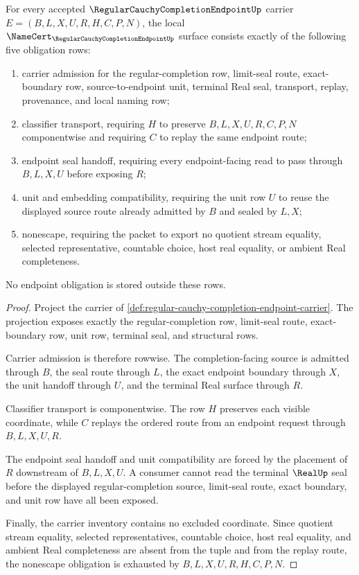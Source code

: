 \begin{theorem}
\label{thm:regular-cauchy-completion-endpoint-namecert-obligations}
For every accepted $\RegularCauchyCompletionEndpointUp$ carrier $E=(B,L,X,U,R,H,C,P,N)$, the local $\NameCert_{\RegularCauchyCompletionEndpointUp}$ surface consists exactly of the following five obligation rows:
\begin{enumerate}
\item carrier admission for the regular-completion row, limit-seal route, exact-boundary row, source-to-endpoint unit, terminal Real seal, transport, replay, provenance, and local naming row;
\item classifier transport, requiring $H$ to preserve $B,L,X,U,R,C,P,N$ componentwise and requiring $C$ to replay the same endpoint route;
\item endpoint seal handoff, requiring every endpoint-facing read to pass through $B,L,X,U$ before exposing $R$;
\item unit and embedding compatibility, requiring the unit row $U$ to reuse the displayed source route already admitted by $B$ and sealed by $L,X$;
\item nonescape, requiring the packet to export no quotient stream equality, selected representative, countable choice, host real equality, or ambient Real completeness.
\end{enumerate}
No endpoint obligation is stored outside these rows.
\end{theorem}
\begin{proof}
Project the carrier of \autoref{def:regular-cauchy-completion-endpoint-carrier}. The projection exposes exactly the regular-completion row, limit-seal route, exact-boundary row, unit row, terminal seal, and structural rows.

Carrier admission is therefore rowwise. The completion-facing source is admitted through $B$, the seal route through $L$, the exact endpoint boundary through $X$, the unit handoff through $U$, and the terminal Real surface through $R$.

Classifier transport is componentwise. The row $H$ preserves each visible coordinate, while $C$ replays the ordered route from an endpoint request through $B,L,X,U,R$.

The endpoint seal handoff and unit compatibility are forced by the placement of $R$ downstream of $B,L,X,U$. A consumer cannot read the terminal $\RealUp$ seal before the displayed regular-completion source, limit-seal route, exact boundary, and unit row have all been exposed.

Finally, the carrier inventory contains no excluded coordinate. Since quotient stream equality, selected representatives, countable choice, host real equality, and ambient Real completeness are absent from the tuple and from the replay route, the nonescape obligation is exhausted by $B,L,X,U,R,H,C,P,N$.
\end{proof}

